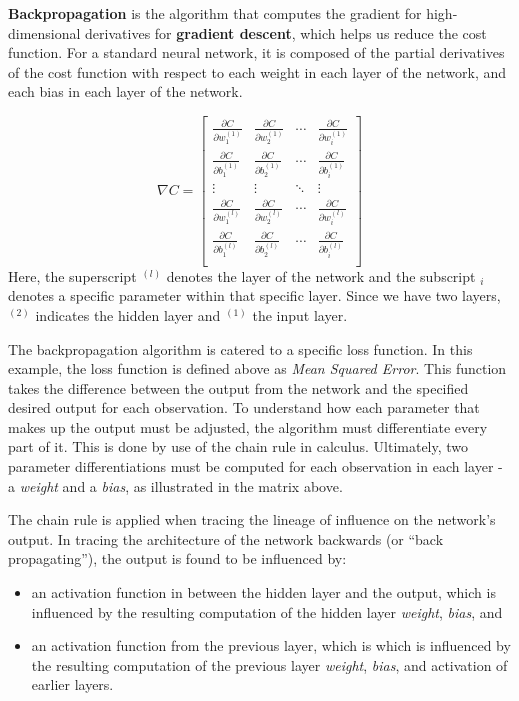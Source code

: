 \documentclass[
]{article}
\providecommand{\tightlist}{%
  \setlength{\itemsep}{0pt}\setlength{\parskip}{0pt}}
\begin{document}
\textbf{Backpropagation} is the algorithm that computes the gradient for
high-dimensional derivatives for \textbf{gradient descent}, which helps
us reduce the cost function. For a standard neural network, it is
composed of the partial derivatives of the cost function with respect to
each weight in each layer of the network, and each bias in each layer of
the network.

\[
\nabla{C} =
\begin{bmatrix}
\frac{\partial{C}}{\partial{w_1^{(1)}}} & \frac{\partial{C}}{\partial{w_2^{(1)}}} & \cdots & 
\frac{\partial{C}}{\partial{w_i^{(1)}}} \\
\frac{\partial{C}}{\partial{b_1^{(1)}}} & \frac{\partial{C}}{\partial{b_2^{(1)}}} & \cdots & 
\frac{\partial{C}}{\partial{b_i^{(1)}}} \\
\vdots & \vdots & \ddots & \vdots \\
\frac{\partial{C}}{\partial{w_1^{(l)}}} & \frac{\partial{C}}{\partial{w_2^{(l)}}} & \cdots & 
\frac{\partial{C}}{\partial{w_i^{(l)}}} \\
\frac{\partial{C}}{\partial{b_1^{(l)}}} & \frac{\partial{C}}{\partial{b_2^{(l)}}} & \cdots & 
\frac{\partial{C}}{\partial{b_i^{(l)}}} \\
\end{bmatrix}
\] Here, the superscript \(^{(l)}\) denotes the layer of the network and
the subscript \(_i\) denotes a specific parameter within that specific
layer. Since we have two layers, \(^{(2)}\) indicates the hidden layer
and \(^{(1)}\) the input layer.

The backpropagation algorithm is catered to a specific loss function. In
this example, the loss function is defined above as \emph{Mean Squared
Error}. This function takes the difference between the output from the
network and the specified desired output for each observation. To
understand how each parameter that makes up the output must be adjusted,
the algorithm must differentiate every part of it. This is done by use
of the chain rule in calculus. Ultimately, two parameter
differentiations must be computed for each observation in each layer - a
\emph{weight} and a \emph{bias}, as illustrated in the matrix above.

The chain rule is applied when tracing the lineage of influence on the
network's output. In tracing the architecture of the network backwards
(or ``back propagating''), the output is found to be influenced by:

\begin{itemize}
\tightlist
\item
  an activation function in between the hidden layer and the output,
  which is influenced by the resulting computation of the hidden layer
  \emph{weight}, \emph{bias}, and
\item
  an activation function from the previous layer, which is which is
  influenced by the resulting computation of the previous layer
  \emph{weight}, \emph{bias}, and activation of earlier layers.
\end{itemize}
\end{document}
